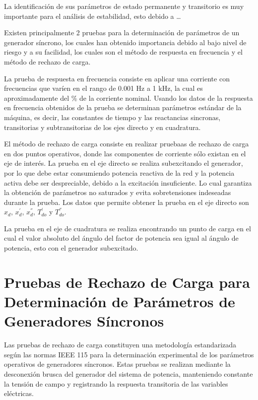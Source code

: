 \documentclass[conference]{IEEEtran}
\begin{document}
La identificación de sus parámetros de estado permanente y transitorio es muy importante para el análisis de estabilidad, esto debido a \dots

Existen principalmente 2 pruebas para la determinación de parámetros de un generador síncrono, los cuales han obtenido importancia debido al bajo nivel de riesgo y a su facilidad, los cuales son el método de respuesta en frecuencia y el método de rechazo de carga.

La prueba de respuesta en frecuencia consiste en aplicar una corriente con frecuencias que varíen en el rango de 0.001 Hz a 1 kHz, la cual es aproximadamente del \% de la corriente nominal. Usando los datos de la respuesta en frecuencia obtenidos de la prueba se determinan parámetros estándar de la máquina, es decir, las constantes de tiempo y las reactancias sincronas, transitorias y subtransitorias de los ejes directo y en cuadratura.

El método de rechazo de carga consiste en realizar pruebaas de rechazo de carga en dos puntos operativos, donde las componentes de corriente sólo existan en el eje de interés. La prueba en el eje directo se realiza subexcitando el generador, por lo que debe estar consumiendo potencia reactiva de la red y la potencia activa debe ser despreciable, debido a la excitación insuficiente. Lo cual garantiza la obtención de parámetros no saturados y evita sobretensiones indeseadas durante la prueba. Los datos que permite obtener la prueba en el eje directo son $x_d$, $x^{'}_d$, $x^{''}_d$, $T^{'}_{do}$ y $T^{''}_{do}$.

La prueba en el eje de cuadratura se realiza encontrando un punto de carga en el cual el valor absoluto del ángulo del factor de potencia sea igual al ángulo de potencia, esto con el generador subexcitado.


\section{Pruebas de Rechazo de Carga para Determinación de Parámetros de Generadores Síncronos} 

Las pruebas de rechazo de carga constituyen una metodología estandarizada según las normas IEEE 115
para la determinación experimental de los parámetros operativos de generadores síncronos. Estas pruebas
se realizan mediante la desconexión brusca del generador del sistema de potencia, manteniendo constante
la tensión de campo y registrando la respuesta transitoria de las variables eléctricas.
\end{document}
